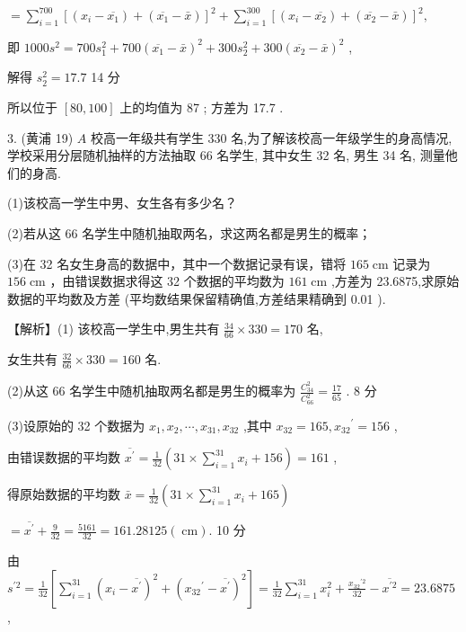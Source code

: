 \documentclass[10pt]{article}
\begin{document}
\(= \mathop{\sum }\limits_{{i = 1}}^{{700}}{\left\lbrack  \left( {x}_{i} - \overline{{x}_{1}}\right)  + \left( \overline{{x}_{1}} - \bar{x}\right) \right\rbrack  }^{2} + \mathop{\sum }\limits_{{i = 1}}^{{300}}{\left\lbrack  \left( {x}_{i} - \overline{{x}_{2}}\right)  + \left( \overline{{x}_{2}} - \bar{x}\right) \right\rbrack  }^{2},\)

即 \({1000}{s}^{2} = {700}{s}_{1}^{2} + {700}{\left( \overline{{x}_{1}} - \bar{x}\right) }^{2} + {300}{s}_{2}^{2} + {300}{\left( \overline{{x}_{2}} - \bar{x}\right) }^{2}\) ,

解得 \({s}_{2}^{2} = {17.7}\) 14 分

所以位于 \(\left\lbrack  {{80},{100}}\right\rbrack\) 上的均值为 87 ; 方差为 17.7 .

3. (黄浦 19) \(A\) 校高一年级共有学生 330 名,为了解该校高一年级学生的身高情况,学校采用分层随机抽样的方法抽取 66 名学生, 其中女生 32 名, 男生 34 名, 测量他们的身高.

(1)该校高一学生中男、女生各有多少名？

(2)若从这 66 名学生中随机抽取两名，求这两名都是男生的概率；

(3)在 32 名女生身高的数据中，其中一个数据记录有误，错将 \({165}\mathrm{\;{cm}}\) 记录为 \({156}\mathrm{\;{cm}}\) ，由错误数据求得这 32 个数据的平均数为 \({161}\mathrm{\;{cm}}\) ,方差为 23.6875,求原始数据的平均数及方差 (平均数结果保留精确值,方差结果精确到 0.01 ).

【解析】(1) 该校高一学生中,男生共有 \(\frac{34}{66} \times  {330} = {170}\) 名,

女生共有 \(\frac{32}{66} \times  {330} = {160}\) 名.

(2)从这 66 名学生中随机抽取两名都是男生的概率为 \(\frac{{C}_{34}^{2}}{{C}_{66}^{2}} = \frac{17}{65}\) . 8 分

(3)设原始的 32 个数据为 \({x}_{1},{x}_{2},\cdots ,{x}_{31},{x}_{32}\) ,其中 \({x}_{32} = {165},{x}_{32}{}^{\prime } = {156}\) ,

由错误数据的平均数 \(\overline{{x}^{\prime }} = \frac{1}{32}\left( {{31} \times  \mathop{\sum }\limits_{{i = 1}}^{{31}}{x}_{i} + {156}}\right)  = {161}\) ,

得原始数据的平均数 \(\bar{x} = \frac{1}{32}\left( {{31} \times  \mathop{\sum }\limits_{{i = 1}}^{{31}}{x}_{i} + {165}}\right)\)

\(= \overline{{x}^{\prime }} + \frac{9}{32} = \frac{5161}{32} = {161.28125}\left( \mathrm{\;{cm}}\right) .\) 10 分

由 \({s}^{\prime 2} = \frac{1}{32}\left\lbrack  {\mathop{\sum }\limits_{{i = 1}}^{{31}}{\left( {x}_{i} - \overline{{x}^{\prime }}\right) }^{2} + {\left( {x}_{32}{}^{\prime } - \overline{{x}^{\prime }}\right) }^{2}}\right\rbrack   = \frac{1}{32}\mathop{\sum }\limits_{{i = 1}}^{{31}}{x}_{i}^{2} + \frac{{x}_{32}{}^{\prime 2}}{32} - \overline{{x}^{\prime 2}} = {23.6875}\) ,
\end{document}
